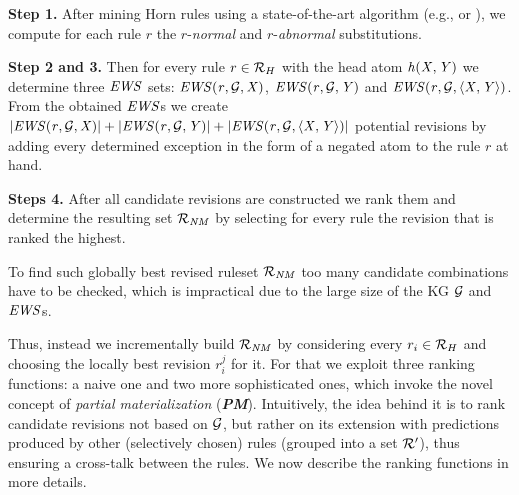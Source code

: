 \noindent \textbf{Step 1.} After mining Horn rules using a state-of-the-art algorithm (e.g., \cite{newrulemine} or \cite{amieplus}), we compute for each rule $r$ the $r$-\emph{normal} and $r$-\emph{abnormal} substitutions.
\medskip


\noindent \textbf{Step 2 and 3.} Then for every rule $r\in \mathcal{R}_H$ with the head atom $\mathit{h(X,Y)}$ we determine three $\mathit{EWS}$ sets: $\mathit{EWS(r,\mathcal{G},X)}$, $\mathit{EWS(r,\mathcal{G},Y)}$ and $\mathit{EWS(r,\mathcal{G},\langle X,Y\rangle)}$. From the obtained $\mathit{EWS}$s we create $|\mathit{EWS(r,\mathcal{G},X)}|+|\mathit{EWS(r,\mathcal{G},Y)}|+|\mathit{EWS(r,\mathcal{G},\langle X,Y\rangle)}|$ potential revisions by adding every determined exception in the form of a negated atom to the rule $r$ at hand.
\medskip

\noindent \textbf{Steps 4.} 
After all candidate revisions are constructed we rank them and determine the resulting set $\mathcal{R}_{\mathit{NM}}$ by selecting for every rule the revision that is ranked the highest.

To find such globally best revised ruleset $\mathcal{R}_{\mathit{NM}}$ too many candidate combinations have to be checked, which is impractical due to the large size of the KG $\mathcal{G}$ and $\mathit{EWS}$s. 

Thus, instead we incrementally build $\mathcal{R}_{\mathit{NM}}$ by considering every $r_i \in \mathcal{R}_{H}$ and choosing the locally best revision $r_i^{j}$ for it.
For that we exploit three ranking functions: a naive one and two more sophisticated ones, which invoke the novel concept of \emph{partial materialization} (\textbf{\em PM}). Intuitively, the idea behind it is to rank candidate revisions not based on $\mathcal{G}$, but rather on its extension with predictions produced by other (selectively chosen) rules (grouped into a set $\mathcal{R}'$), thus ensuring a cross-talk between the rules. We now describe the ranking functions in more details.

